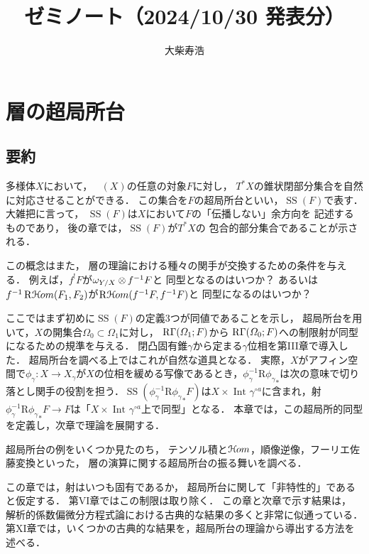 \documentclass[uplatex,dvipdfmx,b5paper,9pt,draft]{jsreport}
\title{ゼミノート（2024/10/30 発表分）}
\author{大柴寿浩}
\theoremstyle{definition}
\numberwithin{equation}{section}
\newcommand{\Dompb}{\mathop{\mathsf{D}^\mathrm{b}}\nolimits}
\newcommand{\HOM}{\mathop{\mathcal{H}\hspace{-0.5pt}om}\nolimits}%
\newcommand{\RHOM}{\mathop{\mathrm{R}\hspace{-1.5pt}\HOM}\nolimits}
\newcommand{\muS}{\mathop{\mathrm{SS}}\nolimits}
\newcommand{\RG}{\mathop{\mathrm{R}\hspace{-0pt}\Gamma}\nolimits}
\newcommand{\Rder}{\mathrm{R}}
\newcommand{\tens}[1][]{\mathbin{\otimes_{\raise1.5ex\hbox to-.1em{}{#1}}}}
\theoremstyle{mystyle}
\newcommand{\Int}[1][]{\mathop{\mathrm{Int}}\nolimits_{#1}}
\begin{document}
\maketitle
\setcounter{chapter}{4}
\chapter{層の超局所台}
\section*{要約}
多様体\(X\)において，
\(\Dompb(X)\)の任意の対象\(F\)に対し，
\(T^{\ast}X\)の錐状閉部分集合を自然に対応させることができる．
この集合を\(F\)の超局所台といい，\(\muS(F)\)で表す．
大雑把に言って，
\(\muS(F)\)は\(X\)において\(F\)の「伝播しない」余方向を
記述するものであり，
後の章では，\(\muS(F)\)が\(T^{\ast}X\)の
包合的部分集合であることが示される．

この概念はまた，
層の理論における種々の関手が交換するための条件を与える．
例えば，\(f^{!}F\)が\(\omega_{Y/X}\tens[]f^{-1}F\)と
同型となるのはいつか？
あるいは\(f^{-1}\RHOM(F_1,F_2)\)が\(\RHOM(f^{-1}F,f^{-1}F)\)と
同型になるのはいつか？

ここではまず初めに\(\muS(F)\)の定義3つが同値であることを示し，
超局所台を用いて，\(X\)の開集合\(\varOmega_0\subset\varOmega_1\)に対し，
\(\RG(\varOmega_1;F)\)から
\(\RG(\varOmega_0;F)\)への制限射が同型になるための規準を与える．
閉凸固有錐\(\gamma\)から定まる\(\gamma\)位相を第III章で導入した．
超局所台を調べる上ではこれが自然な道具となる．
実際，\(X\)がアフィン空間で\(
    \phi_{\gamma}\colon X\to X_{\gamma}
\)が\(X\)の位相を緩める写像であるとき，\(
    \phi_{\gamma}^{-1}\Rder{{\phi_{\gamma}}_{\ast}}
\)は次の意味で切り落とし関手の役割を担う．\(
    \muS(\phi_{\gamma}^{-1}\Rder{{\phi_{\gamma}}_{\ast}}F)
\)は\(X\times\Int[]\gamma^{\circ a}\)に含まれ，射\(
    \phi_{\gamma}^{-1}\Rder{{\phi_{\gamma}}_{\ast}}F\to F
\)は「\(X\times\Int[]\gamma^{\circ a}\)上で同型」となる．
本章では，この超局所的同型を定義し，次章で理論を展開する．

超局所台の例をいくつか見たのち，
テンソル積と\(\HOM\)，順像逆像，フーリエ佐藤変換といった，
層の演算に関する超局所台の振る舞いを調べる．

この章では，射はいつも固有であるか，
超局所台に関して「非特性的」であると仮定する．
第VI章ではこの制限は取り除く．
この章と次章で示す結果は，
解析的係数偏微分方程式論における古典的な結果の多くと非常に似通っている．
第XI章では，いくつかの古典的な結果を，超局所台の理論から導出する方法を述べる．
\end{document}
